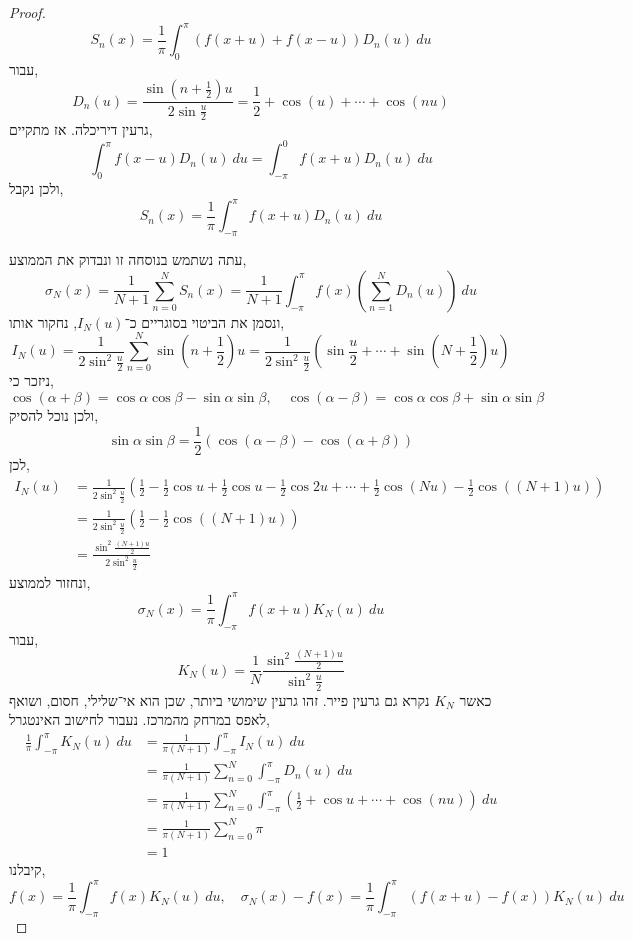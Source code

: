 \begin{proof}
	\[
		S_n(x)
		= \frac{1}{\pi} \int_{0}^{\pi} (f(x + u) + f(x - u)) D_n(u)\ du
	\]
	עבור,
	\[
		D_n(u)
		= \frac{\sin(n + \frac{1}{2}) u}{2 \sin \frac{u}{2}}
		= \frac{1}{2} + \cos(u) + \cdots + \cos(n u)
	\]
	גרעין דיריכלה.
	אז מתקיים,
	\[
		\int_{0}^{\pi} f(x - u) D_n(u)\ du
		= \int_{-\pi}^{0} f(x + u) D_n(u)\ du
	\]
	ולכן נקבל,
	\[
		S_n(x)
		= \frac{1}{\pi} \int_{-\pi}^{\pi} f(x + u) D_n(u)\ du
	\]

	עתה נשתמש בנוסחה זו ונבדוק את הממוצע,
	\[
		\sigma_N(x)
		= \frac{1}{N + 1} \sum_{n = 0}^N S_n(x)
		= \frac{1}{N + 1} \int_{-\pi}^{\pi} f(x) \left(\sum_{n = 1}^N D_n(u)\right)\ du
	\]
	ונסמן את הביטוי בסוגריים כ־$I_N(u)$, נחקור אותו,
	\[
		I_N(u)
		= \frac{1}{2 \sin^2 \frac{u}{2}} \sum_{n = 0}^N \sin(n + \frac{1}{2}) u
		= \frac{1}{2 \sin^2 \frac{u}{2}}\left( \sin \frac{u}{2} + \cdots + \sin (N + \frac{1}{2}) u\right)
	\]
	ניזכר כי,
	\[
		\cos(\alpha + \beta) = \cos \alpha \cos \beta - \sin \alpha \sin \beta,
		\quad
		\cos(\alpha - \beta)=  \cos \alpha \cos \beta + \sin \alpha \sin \beta
	\]
	ולכן נוכל להסיק,
	\[
		\sin \alpha \sin \beta = \frac{1}{2}(\cos(\alpha - \beta) - \cos(\alpha + \beta))
	\]
	לכן,
	\begin{align*}
		I_N(u)
		& = \frac{1}{2 \sin^2 \frac{u}{2}} \left(\frac{1}{2} - \frac{1}{2} \cos u + \frac{1}{2} \cos u - \frac{1}{2} \cos 2u + \cdots + \frac{1}{2} \cos(N u) - \frac{1}{2} \cos((N + 1) u)\right) \\
		& = \frac{1}{2 \sin^2 \frac{u}{2}}\left(\frac{1}{2} - \frac{1}{2} \cos((N + 1) u)\right) \\
		& = \frac{\sin^2 \frac{(N + 1) u}{2}}{2 \sin^2 \frac{u}{2}}
	\end{align*}
	ונחזור לממוצע,
	\[
		\sigma_N(x)
		= \frac{1}{\pi} \int_{-\pi}^{\pi} f(x + u) K_N(u)\ du
	\]
	עבור,
	\[
		K_N(u)
		= \frac{1}{N} \frac{\sin^2 \frac{(N + 1) u}{2}}{\sin^2 \frac{u}{2}}
	\]
	כאשר $K_N$ נקרא גם גרעין פייר.
	זהו גרעין שימושי ביותר, שכן הוא אי־שלילי, חסום, ושואף לאפס במרחק מהמרכז.
	נעבור לחישוב האינטגרל,
	\begin{align*}
		\frac{1}{\pi} \int_{-\pi}^{\pi} K_N(u)\ du
		& = \frac{1}{\pi(N + 1)} \int_{-\pi}^{\pi} I_N(u)\ du \\
		& = \frac{1}{\pi(N + 1)} \sum_{n = 0}^N \int_{-\pi}^{\pi} D_n(u)\ du \\
		& = \frac{1}{\pi(N + 1)} \sum_{n = 0}^N \int_{-\pi}^{\pi} (\frac{1}{2} + \cos u + \cdots + \cos(n u))\ du \\
		& = \frac{1}{\pi(N + 1)} \sum_{n = 0}^N \pi \\
		& = 1
	\end{align*}
	קיבלנו,
	\[
		f(x)
		= \frac{1}{\pi} \int_{-\pi}^{\pi} f(x) K_N(u)\ du,
		\quad
		\sigma_N(x) - f(x)
		= \frac{1}{\pi} \int_{-\pi}^{\pi} (f(x + u) - f(x)) K_N(u)\ du
	\]


\end{proof}
